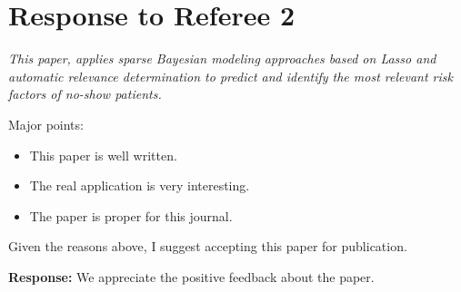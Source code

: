 \documentclass[11pt,a4paper,oneside]{article}
\begin{document}
\newpage 

\section*{Response to Referee 2}

{\em This paper, applies sparse Bayesian modeling approaches based on Lasso and automatic relevance determination to predict and identify the most relevant risk factors of no-show patients.

Major points:
\begin{itemize}
\item This paper is well written. 
\item The real application is very interesting.
\item The paper is proper for this journal.
\end{itemize}

Given the reasons above, I suggest accepting this paper for publication.
}

\vspace{12pt}
{\bf Response:} We appreciate the positive feedback about the paper.



\end{document}
